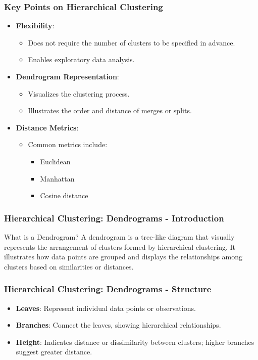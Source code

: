\documentclass[aspectratio=169]{beamer}
\begin{document}
\begin{frame}[fragile]
    \frametitle{Key Points on Hierarchical Clustering}
    \begin{itemize}
        \item \textbf{Flexibility}:
            \begin{itemize}
                \item Does not require the number of clusters to be specified in advance.
                \item Enables exploratory data analysis.
            \end{itemize}
        \item \textbf{Dendrogram Representation}:
            \begin{itemize}
                \item Visualizes the clustering process.
                \item Illustrates the order and distance of merges or splits.
            \end{itemize}
        \item \textbf{Distance Metrics}:
            \begin{itemize}
                \item Common metrics include:
                \begin{itemize}
                    \item Euclidean
                    \item Manhattan
                    \item Cosine distance
                \end{itemize}
            \end{itemize}
    \end{itemize}
\end{frame}

\begin{frame}[fragile]
    \frametitle{Hierarchical Clustering: Dendrograms - Introduction}
    \begin{block}{What is a Dendrogram?}
        A dendrogram is a tree-like diagram that visually represents the arrangement of clusters formed by hierarchical clustering. It illustrates how data points are grouped and displays the relationships among clusters based on similarities or distances.
    \end{block}
\end{frame}

\begin{frame}[fragile]
    \frametitle{Hierarchical Clustering: Dendrograms - Structure}
    \begin{itemize}
        \item \textbf{Leaves}: Represent individual data points or observations.
        \item \textbf{Branches}: Connect the leaves, showing hierarchical relationships.
        \item \textbf{Height}: Indicates distance or dissimilarity between clusters; higher branches suggest greater distance.
    \end{itemize}
\end{frame}
\end{document}
